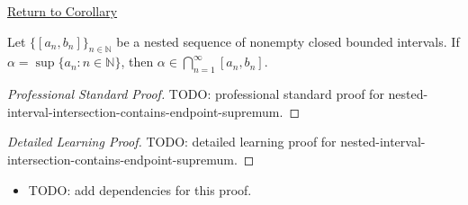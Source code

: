 \newpage
{}
\label{prf:nested-interval-intersection-contains-endpoint-supremum}

\begin{remark*}[Return]
\hyperref[cor:nested-interval-intersection-contains-endpoint-supremum]{Return to Corollary}
\end{remark*}

\begin{corollary*}
Let $\{[a_n,b_n]\}_{n\in\mathbb N}$ be a nested sequence of nonempty closed
bounded intervals. If $\alpha=\sup\{a_n:n\in\mathbb N\}$, then
$\alpha\in \bigcap_{n=1}^{\infty}[a_n,b_n]$.
\end{corollary*}

\begin{proof}[Professional Standard Proof]
\LRAProofBodyStart
TODO: professional standard proof for nested-interval-intersection-contains-endpoint-supremum.
\end{proof}

\begin{proof}[Detailed Learning Proof]
\LRAProofBodyStart
TODO: detailed learning proof for nested-interval-intersection-contains-endpoint-supremum.
\end{proof}

\begin{remark*}
\end{remark*}

\begin{dependencies}
\begin{itemize}
  \item TODO: add dependencies for this proof.
\end{itemize}
\end{dependencies}

\clearpage
